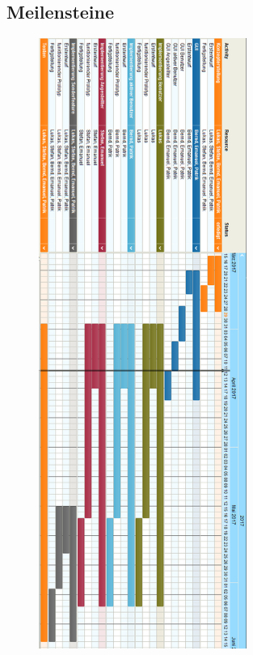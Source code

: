 \subsection{Meilensteine}
 \begin{figure}[ht!]
  \includegraphics[width = 68mm]{pictures/Zeitplanneu.PNG}
 \end{figure}